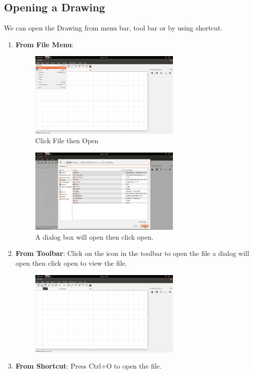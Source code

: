 \subsection{Opening a Drawing}
We can open the Drawing from menu bar, tool bar or by using shortcut.
 \begin{enumerate}
\item \textbf{From File Menu}:
\begin{figure}[h!]
\centering
\includegraphics[width=0.7\textwidth]{images/fileopen.png}\\
Click File then Open
\end{figure}
\begin{figure}[h!]
  \centering
   \includegraphics[width=0.7\textwidth]{images/opendialog.png}\\
    A dialog box will open then click open.
\end{figure}
\newpage
\item \textbf{From Toolbar}: Click on the icon in the toolbar to open the file a dialog will open then click open to view the file.
\begin{figure}[h!]
  \centering
  \includegraphics[width=0.7\textwidth]{images/toolopen.png}
\end{figure}
\item \textbf{From Shortcut}: Press Ctrl+O to open the file.
\end{enumerate}